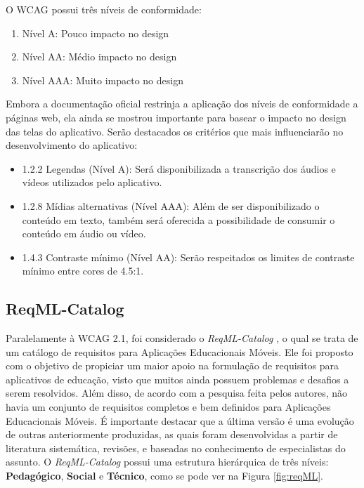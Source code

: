O WCAG possui três níveis de conformidade:
\begin{enumerate}
    \item Nível A: Pouco impacto no design
    \item Nível AA: Médio impacto no design
    \item Nível AAA: Muito impacto no design
\end{enumerate}

Embora a documentação oficial restrinja a aplicação dos níveis de conformidade a páginas web, ela ainda se mostrou importante para basear o impacto no design das telas do aplicativo. 
Serão destacados os critérios que mais influenciarão no desenvolvimento do aplicativo:

\begin{itemize}
    \item 1.2.2 Legendas (Nível A): Será disponibilizada a transcrição dos áudios e vídeos utilizados pelo aplicativo.
    \item 1.2.8 Mídias alternativas (Nível AAA): Além de ser disponibilizado o conteúdo em texto, também será oferecida a possibilidade de consumir o conteúdo em áudio ou vídeo.
    \item 1.4.3 Contraste mínimo (Nível AA): Serão respeitados os limites de contraste mínimo entre cores de 4.5:1.
\end{itemize}


\subsection{ReqML-Catalog}
Paralelamente à WCAG 2.1, foi considerado o \textit{ReqML-Catalog}
\citep{soad2017reqml}, o qual se trata de um catálogo de requisitos para Aplicações Educacionais Móveis. Ele foi proposto com o objetivo de propiciar um maior apoio na formulação de requisitos para aplicativos de educação, visto que muitos ainda possuem problemas e desafios a serem resolvidos. Além disso, de acordo com a pesquisa feita pelos autores, não havia um conjunto de requisitos completos e bem definidos para Aplicações Educacionais Móveis. É importante destacar que a última versão é uma evolução de outras anteriormente produzidas, as quais foram desenvolvidas a partir de literatura sistemática, revisões, e baseadas no conhecimento de especialistas do assunto. 
O \textit{ReqML-Catalog} possui uma estrutura hierárquica de três níveis: \textbf{Pedagógico}, \textbf{Social} e \textbf{Técnico}, como se pode ver na Figura \ref{fig:reqML}.

